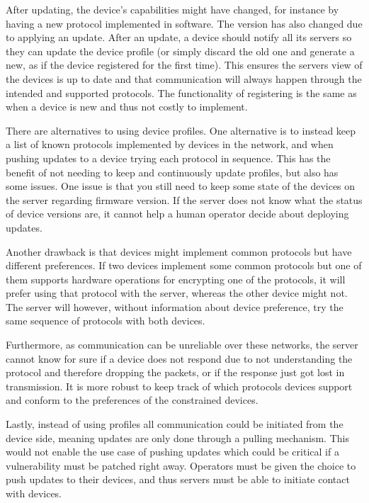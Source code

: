 \documentclass[0-thesis.tex]{subfiles}
\begin{document}
After updating, the device's capabilities might have changed, for instance by having a new
protocol implemented in software. The version has also changed due to applying an update.
After an update, a device should notify all its servers so they can update the device
profile (or simply discard the old one and generate a new, as if the device registered for
the first time). This ensures the servers view of the devices is up to date and that
communication will always happen through the intended and supported protocols. The
functionality of registering is the same as when a device is new and thus not costly to
implement.

There are alternatives to using device profiles. One alternative is to instead keep a list
of known protocols implemented by devices in the network, and when pushing updates to a
device trying each protocol in sequence. This has the benefit of not needing to keep and
continuously update profiles, but also has some issues. One issue is that you still need
to keep some state of the devices on the server regarding firmware version. If the server
does not know what the status of device versions are, it cannot help a human operator
decide about deploying updates. 

Another drawback is that devices might implement common protocols but have different
preferences. If two devices implement some common protocols but one of them supports
hardware operations for encrypting one of the protocols, it will prefer using that
protocol with the server, whereas the other device might not. The server will however,
without information about device preference, try the same sequence of protocols with both
devices.

Furthermore, as communication can be unreliable over these networks, the server
cannot know for sure if a device does not respond due to not understanding the protocol
and therefore dropping the packets, or if the response just got lost in transmission. It
is more robust to keep track of which protocols devices support and conform to the
preferences of the constrained devices.

Lastly, instead of using profiles all communication could be initiated from the device
side, meaning updates are only done through a pulling mechanism. This would not enable the
use case of pushing updates which could be critical if a vulnerability must be patched
right away. Operators must be given the choice to push updates to their devices, and thus
servers must be able to initiate contact with devices.
\end{document}

